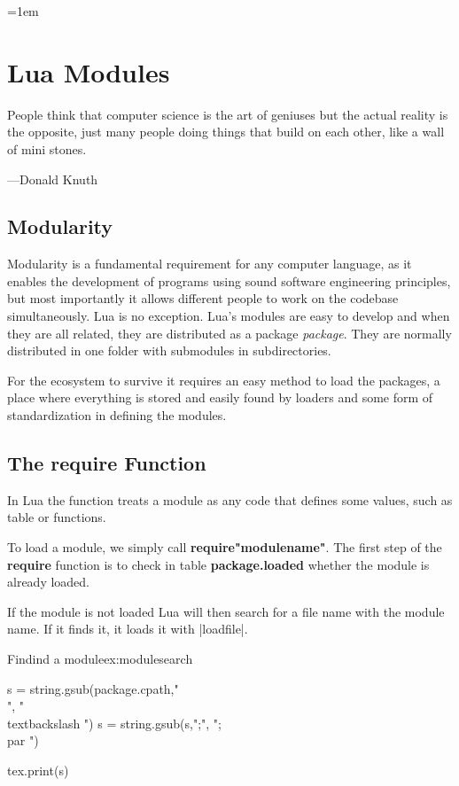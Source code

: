 
\newfontfamily{}
\def\texthiero#1{{\color{black!95}\hiero #1}}
\parindent=1em   

\chapter{Lua Modules}

\epigraph{People think that computer science is the art of geniuses but the actual reality is the opposite, just many people doing things that build on each other, like a wall of mini stones.}{---Donald Knuth}


\section{Modularity}

Modularity is a fundamental requirement for any computer language, as it enables the development of programs using sound software engineering principles, but most importantly it allows different people to work on the codebase simultaneously. Lua is no exception. Lua's modules are easy to develop and when they are all related, they are distributed as a package \textit{package}. They are normally distributed in one folder with submodules in subdirectories. 

For the ecosystem to survive it requires an easy method to load the packages, a place where everything is stored and easily found by loaders and some form of standardization in defining the modules. 

\section{The require Function}

In Lua the  function treats a module as any code that defines some values, such as table or functions. 

To load  a module, we simply call \textbf{require"modulename"}. The first step of the \textbf{require} function is to check in table \textbf{package.loaded} whether the module is already loaded.

If the module is not loaded Lua will then search for a file name with the module name. If it finds it, it loads it with |loadfile|. 


\begin{texexample}{Findind a module}{ex:modulesearch}
\begin{luacode*}
s = string.gsub(package.cpath,"\\", "\\textbackslash ")
s = string.gsub(s,";", ";\\par ")

tex.print(s)
\end{luacode*}
\end{texexample}


